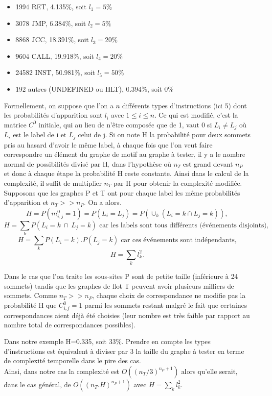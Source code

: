 \begin{itemize}
 \item 1994 RET, 4.135\%, soit $l_1=5\%$
 \item 3078 JMP, 6.384\%, soit $l_2=5\%$
 \item 8868 JCC, 18.391\%, soit $l_3=20\%$
 \item 9604 CALL, 19.918\%, soit $l_4=20\%$
 \item 24582 INST, 50.981\%, soit $l_5=50\%$
 \item 192 autres (UNDEFINED ou HLT), 0.394\%, soit $0\%$
\\
\end{itemize}

Formellement, on suppose que l'on a $n$ différents types d'instructions (ici 5) dont les probabilités d'apparition sont $l_i$ avec $1\le i\le n$.
Ce qui est modifié, c'est la matrice $C^0$ initiale, qui au lieu de n'être composée que de 1, vaut 0 si $L_i\ne L_j$ où $L_i$ est le label de i et $L_j$ celui de j. Si on note H la probabilité pour deux sommets pris au hasard d'avoir
le même label, à chaque fois que l'on veut faire correspondre un élément du graphe de motif au graphe à tester, il y a le nombre
normal de possibilités divisé par H, dans l'hypothèse où $n_T$ est grand devant $n_P$ et donc à chaque étape la probabilité H reste
constante. Ainsi dans le calcul de la complexité, il suffit de multiplier $n_T$ par H pour obtenir la complexité modifiée.
\\

Supposons que les graphes P et T ont pour chaque label les même probabilités d'apparition et $n_T >> n_P.$
On a alors. $$H=P(m^0_{i, j}=1)=P(L_i=L_j)=P(\cup_k(L_i=k \cap L_j=k)),$$
$$H=\sum_kP(L_i=k\ \cap\ L_j=k) \mbox{ car les labels sont tous différents (événements disjoints),}$$
$$H=\sum_kP(L_i=k).P(L_j=k) \mbox{ car ces événements sont indépendants,}$$
$$H=\sum_kl_k^2.$$

Dans le cas que l'on traite les sous-sites P sont de petite taille (inférieure à 24 sommets) tandis que les graphes de flot T peuvent avoir plusieurs milliers de sommets.
Comme $n_T >> n_P$, chaque choix de correspondance ne modifie pas la probabilité H que $C^0_{i, j}=1$ parmi les sommets restant
malgré le fait que certaines correspondances
aient déjà été choisies (leur nombre est très faible par rapport au nombre total de correspondances possibles).

Dans notre exemple H=0.335, soit 33\%. Prendre en compte les types d'instructions est équivalent à diviser par 3 la taille du graphe à tester
en terme de complexité temporelle dans le pire des cas.
\\
Ainsi, dans notre cas la complexité est $O((n_T/3)^{n_P+1})$ alors qu'elle serait, dans le cas général, de $O((n_T.H)^{n_P+1})$ avec $H=\sum_kl_k^2$.

